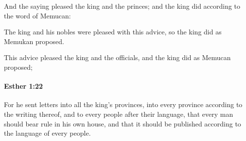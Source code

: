 			\begin{versebox}
					\item[BHS] 
					\item[LXX] 
					\item[ASV] And the saying pleased the king and the princes; and the king did according to the word of Memucan:
					\item[NIV] The king and his nobles were pleased with this advice, so the king did as Memukan proposed.
					\item[NRSV] This advice pleased the king and the officials, and the king did as Memucan proposed;
			\end{versebox}

		\paragraph{Esther 1:22} %
			\label{ESTHER-1-22}

			For he sent letters into all the king’s provinces, into every province according to the writing thereof, and to every people after their language, that every man should bear rule in his own house, and that it should be published according to the language of every people.

